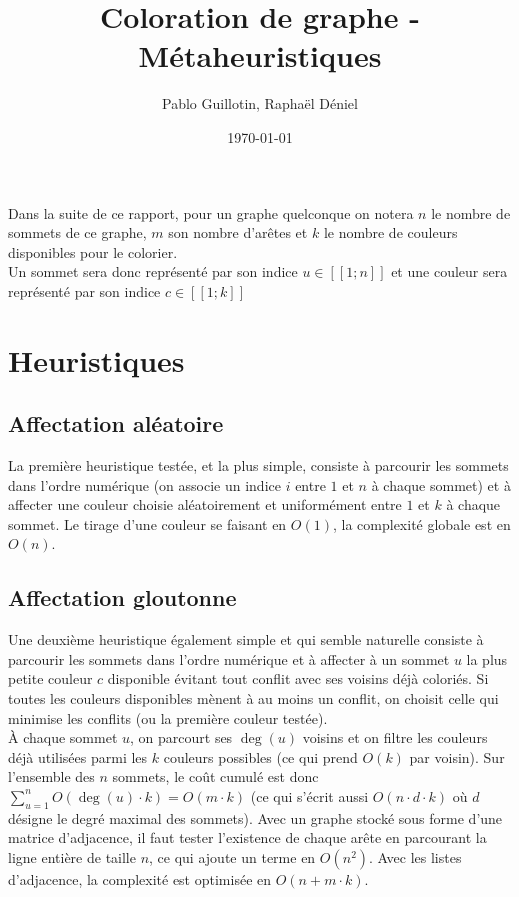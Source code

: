 \documentclass{article}
\begin{document}
\author{Pablo Guillotin, Raphaël Déniel}
\date{\today}

\title{Coloration de graphe - Métaheuristiques}
\maketitle

\tableofcontents
\newpage

Dans la suite de ce rapport, pour un graphe quelconque on notera $n$ le nombre de sommets de ce graphe, $m$ son nombre d'arêtes et $k$ le nombre de couleurs disponibles pour le colorier.\\
Un sommet sera donc représenté par son indice $u \in [\![1;n]\!]$ et une couleur sera représenté par son indice $c \in [\![1;k]\!]$

\section{Heuristiques}

\subsection{Affectation aléatoire}
La première heuristique testée, et la plus simple, consiste à parcourir les sommets dans l'ordre numérique (on associe un indice $i$ entre $1$ et $n$ à chaque sommet) et à affecter une couleur choisie aléatoirement et uniformément entre $1$ et $k$ à chaque sommet. Le tirage d'une couleur se faisant en $O(1)$, la complexité globale est en $O(n)$.

\subsection{Affectation gloutonne}
Une deuxième heuristique également simple et qui semble naturelle consiste à parcourir les sommets dans l'ordre numérique et à affecter à un sommet $u$ la plus petite couleur $c$ disponible évitant tout conflit avec ses voisins déjà coloriés. Si toutes les couleurs disponibles mènent à au moins un conflit, on choisit celle qui minimise les conflits (ou la première couleur testée).\\

À chaque sommet $u$, on parcourt ses $\deg(u)$ voisins et on filtre les couleurs déjà utilisées parmi les $k$ couleurs possibles (ce qui prend $O(k)$ par voisin). Sur l'ensemble des $n$ sommets, le coût cumulé est donc $\sum_{u=1}^n O(\deg(u) \cdot k) = O(m \cdot k)$ (ce qui s'écrit aussi $O(n \cdot d \cdot k)$ où $d$ désigne le degré maximal des sommets).
Avec un graphe stocké sous forme d'une matrice d'adjacence, il faut tester l'existence de chaque arête en parcourant la ligne entière de taille $n$, ce qui ajoute un terme en $O(n^2)$. Avec les listes d'adjacence, la complexité est optimisée en $O(n + m \cdot k)$.
\end{document}
